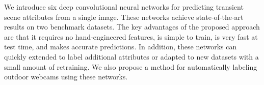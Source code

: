 \documentclass{article}
\begin{document}
We introduce six deep convolutional neural networks for predicting
transient scene attributes from a single image. These networks achieve
state-of-the-art results on two benchmark datasets. The key advantages
of the proposed approach are that it requires no hand-engineered
features, is simple to train, is very fast at test time, and makes
accurate predictions. In addition, these networks can quickly extended
to label additional attributes or adapted to new datasets with a small
amount of retraining.  We also propose a method for automatically labeling 
outdoor webcams using these networks.

{\small


}
\end{document}
